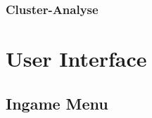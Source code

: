 \subsubsection{Cluster-Analyse}


\section{User Interface}
\label{sec:UIMenu}
\subsection{Ingame Menu}


